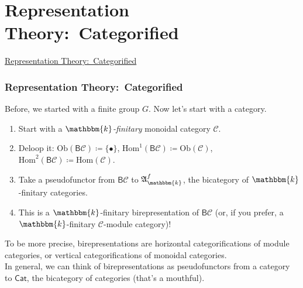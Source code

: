 \documentclass{beamer}
\newcommand{\obset}{\mathrm{Ob}}
\newcommand{\homset}{\mathrm{Hom}}
\newcommand{\textcat}[1]{\mathrm{\textsf{#1}}}
\newcommand*{\emphasis}[1]{\textcolor{structure}{\em #1}}
\begin{document}

\section{Representation Theory:\ Categorified}

\begin{frame}
\centerline{\huge\textcolor{structure}{\underline{Representation Theory:\ Categorified}}}
\end{frame}

\begin{frame}
\frametitle{Representation Theory:\ Categorified}
Before, we started with a finite group $G$. Now let's start with a category.\\[2ex]
\begin{enumerate}
\item Start with a \emphasis{$\mathbbm{k}$-finitary} monoidal category $\mathcal{C}$.
\item Deloop it: $\obset(\textcat{B}\mathcal{C}) \coloneqq \{\bullet\}$, $\homset^1(\textcat{B}\mathcal{C}) \coloneqq \obset(\mathcal{C})$, \hphantom{Deloop it: $\obset(\textcat{B}\mathcal{C}) \coloneqq \{\bullet\}$,\ }$\homset^2(\textcat{B}\mathcal{C}) \coloneqq \homset(\mathcal{C})$.
\item Take a pseudofunctor from $\textcat{B}\mathcal{C}$ to $\mathfrak{A}_\mathbbm{k}^f$, the bicategory of $\mathbbm{k}$-finitary categories.
\item This is a $\mathbbm{k}$-finitary birepresentation of $\textcat{B}\mathcal{C}$ (or, if you prefer, a $\mathbbm{k}$-finitary $\mathcal{C}$-module category)!\\[2ex]
\end{enumerate}
To be more precise, birepresentations are horizontal categorifications of module categories, or vertical categorifications of monoidal categories.\\[2ex]
In general, we can think of birepresentations as pseudofunctors from a category to $\textcat{Cat}$, the bicategory of categories (that's a mouthful).\\[2ex]
\end{frame}
\end{document}
